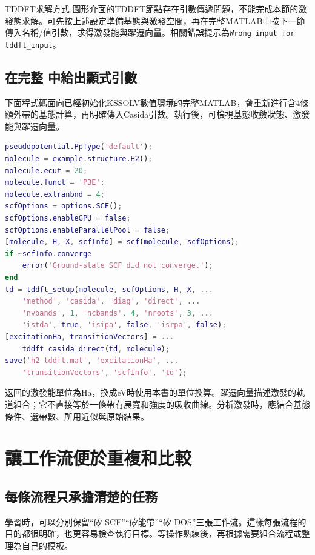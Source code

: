 \begin{notebox}{TDDFT求解方式}
圖形介面的TDDFT節點存在引數傳遞問題，不能完成本節的激發態求解。可先按上述設定準備基態與激發空間，再在完整MATLAB\regmark{}中按下一節傳入名稱/值引數，求得激發能與躍遷向量。相關錯誤提示為\texttt{Wrong input for tddft\_input}。
\end{notebox}

\subsection{在完整 \regmark{} 中給出顯式引數}

下面程式碼面向已經初始化KSSOLV數值環境的完整MATLAB\regmark{}，會重新進行含4條額外帶的基態計算，再明確傳入Casida引數。執行後，可檢視基態收斂狀態、激發能與躍遷向量。

\noindent\begin{minipage}{\linewidth}
\begin{lstlisting}[language=Matlab]
pseudopotential.PpType('default');
molecule = example.structure.H2();
molecule.ecut = 20;
molecule.funct = 'PBE';
molecule.extranbnd = 4;
scfOptions = options.SCF();
scfOptions.enableGPU = false;
scfOptions.enableParallelPool = false;
[molecule, H, X, scfInfo] = scf(molecule, scfOptions);
if ~scfInfo.converge
    error('Ground-state SCF did not converge.');
end
td = tddft_setup(molecule, scfOptions, H, X, ...
    'method', 'casida', 'diag', 'direct', ...
    'nvbands', 1, 'ncbands', 4, 'nroots', 3, ...
    'istda', true, 'isipa', false, 'isrpa', false);
[excitationHa, transitionVectors] = ...
    tddft_casida_direct(td, molecule);
save('h2-tddft.mat', 'excitationHa', ...
    'transitionVectors', 'scfInfo', 'td');
\end{lstlisting}
\end{minipage}

返回的激發能單位為Ha，換成eV時使用本書的單位換算。躍遷向量描述激發的軌道組合；它不直接等於一條帶有展寬和強度的吸收曲線。分析激發時，應結合基態條件、選帶數、所用近似與原始結果。


\section{讓工作流便於重複和比較}

\subsection{每條流程只承擔清楚的任務}

學習時，可以分別保留“矽 SCF”“矽能帶”“矽 DOS”三張工作流。這樣每張流程的目的都很明確，也更容易檢查執行目標。等操作熟練後，再根據需要組合流程或整理為自己的模板。

